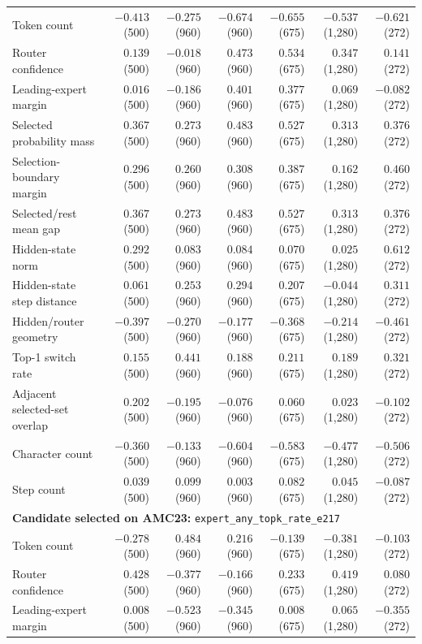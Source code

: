 \begin{longtable}{@{}lrrrrrr@{}}
Token count & $-0.413$ (500) & $-0.275$ (960) & $-0.674$ (960) & $-0.655$ (675) & $-0.537$ (1,280) & $-0.621$ (272) \\
Router confidence & $0.139$ (500) & $-0.018$ (960) & $0.473$ (960) & $0.534$ (675) & $0.347$ (1,280) & $0.141$ (272) \\
Leading-expert margin & $0.016$ (500) & $-0.186$ (960) & $0.401$ (960) & $0.377$ (675) & $0.069$ (1,280) & $-0.082$ (272) \\
Selected probability mass & $0.367$ (500) & $0.273$ (960) & $0.483$ (960) & $0.527$ (675) & $0.313$ (1,280) & $0.376$ (272) \\
Selection-boundary margin & $0.296$ (500) & $0.260$ (960) & $0.308$ (960) & $0.387$ (675) & $0.162$ (1,280) & $0.460$ (272) \\
Selected/rest mean gap & $0.367$ (500) & $0.273$ (960) & $0.483$ (960) & $0.527$ (675) & $0.313$ (1,280) & $0.376$ (272) \\
Hidden-state norm & $0.292$ (500) & $0.083$ (960) & $0.084$ (960) & $0.070$ (675) & $0.025$ (1,280) & $0.612$ (272) \\
Hidden-state step distance & $0.061$ (500) & $0.253$ (960) & $0.294$ (960) & $0.207$ (675) & $-0.044$ (1,280) & $0.311$ (272) \\
Hidden/router geometry & $-0.397$ (500) & $-0.270$ (960) & $-0.177$ (960) & $-0.368$ (675) & $-0.214$ (1,280) & $-0.461$ (272) \\
Top-1 switch rate & $0.155$ (500) & $0.441$ (960) & $0.188$ (960) & $0.211$ (675) & $0.189$ (1,280) & $0.321$ (272) \\
Adjacent selected-set overlap & $0.202$ (500) & $-0.195$ (960) & $-0.076$ (960) & $0.060$ (675) & $0.023$ (1,280) & $-0.102$ (272) \\
Character count & $-0.360$ (500) & $-0.133$ (960) & $-0.604$ (960) & $-0.583$ (675) & $-0.477$ (1,280) & $-0.506$ (272) \\
Step count & $0.039$ (500) & $0.099$ (960) & $0.003$ (960) & $0.082$ (675) & $0.045$ (1,280) & $-0.087$ (272) \\
\midrule
\multicolumn{7}{l}{\textbf{Candidate selected on AMC23:} \texttt{expert\_any\_topk\_rate\_e217}} \\
Token count & $-0.278$ (500) & $0.484$ (960) & $0.216$ (960) & $-0.139$ (675) & $-0.381$ (1,280) & $-0.103$ (272) \\
Router confidence & $0.428$ (500) & $-0.377$ (960) & $-0.166$ (960) & $0.233$ (675) & $0.419$ (1,280) & $0.080$ (272) \\
Leading-expert margin & $0.008$ (500) & $-0.523$ (960) & $-0.345$ (960) & $0.008$ (675) & $0.065$ (1,280) & $-0.355$ (272) \\

\end{longtable}
